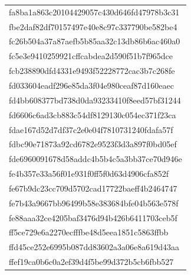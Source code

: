\begin{tabular}{l}
fa8ba1a863c20104429057c430d646fd47978b3c31 \\
fbe2daf82df70157497e40e8c97c337790be582be4 \\
fc26b504a37a87aefb5b85aa32c13db86b6ac460a0 \\
fc5e3e9410259921cffcabdea2d590f51b7f965dce \\
fcb238890dfd4331e9493f52228772cac3b7c268fe \\
fd033604eadf296e85da3f04e980ceaf87d160eaec \\
fd4bb608377bd738d0da93233410f8eed57bf31244 \\
fd6606c6ad3cb883c54df8129130c054ec371f23ca \\
fdae167d52d7df37c2e0e04f7810731240fdafa57f \\
fdbc90e71873a92cd6782e9523f3d3a897f0bd05ef \\
fde6960091678d58addc4b5b4c5a3bb37ce70d946e \\
fe4b357e33a56f01e931f0ff5f0d63d4906cfa852f \\
fe67b9dc23cc709d5702cad17722baeff4b2464747 \\
fe7b43a9667bb96499b58e383684bfe04b563e578f \\
fe88aaa32ce4205baf3476d94b426b6411703ceb5f \\
ff5ce729e6a2270ecfffbe48d5eea1851c5863ffbb \\
ffd45ce252e6995b087dd83602a3a06e8a619d43aa \\
ffef19ca0b6c0a2ef39d4f5be99d372b5cb6fbb527 \\
\bottomrule
\end{tabular}
